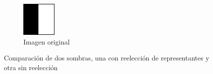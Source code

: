 \begin{figure}[hp]
\begin{subfigure}[t]{0.2\textwidth}
		\includegraphics[width=\textwidth]{images/rep_original}
		\caption{Imagen original}
	\end{subfigure}
	\caption{Comparación de dos sombras, una con reelección de
	representantes y otra sin reelección}
	\label{fig:LVCS_representantes}
\end{figure}
